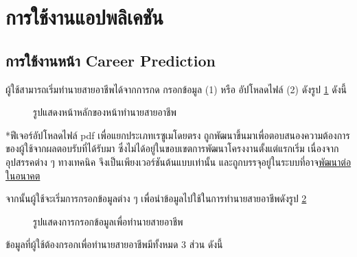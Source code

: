 \section{การใช้งานแอปพลิเคชัน}
\subsection{การใช้งานหน้า Career Prediction}
ผู้ใช้สามารถเริ่มทำนายสายอาชีพได้จากการกด กรอกข้อมูล (1) หรือ อัปโหลดไฟล์ (2) ดังรูป \ref{fig:start-CP} ดังนี้
\begin{figure}[H]\centering
    \caption{รูปแสดงหน้าหลักของหน้าทำนายสายอาชีพ}\label{fig:start-CP}
\end{figure}
*ฟีเจอร์อัปโหลดไฟล์ pdf เพื่อแยกประเภทเรซูเมโดยตรง ถูกพัฒนาขึ้นมาเพื่อตอบสนองความต้องการของผู้ใช้จากผลตอบรับที่ได้รับมา 
ซึ่งไม่ได้อยู่ในขอบเขตการพัฒนาโครงงานตั้งแต่แรกเริ่ม เนื่องจากอุปสรรคต่าง ๆ ทางเทคนิค จึงเป็นเพียงเวอร์ชันต้นแบบเท่านั้น และถูกบรรจุอยู่ในระบบที่อาจ\hyperref[subsec:Future Plan OCR]{พัฒนาต่อในอนาคต}

จากนั้นผู้ใช้จะเริ่มการกรอกข้อมูลต่าง ๆ เพื่อนำข้อมูลไปใช้ในการทำนายสายอาชีพดังรูป \ref{fig:input-CP} 
\begin{figure}[H]\centering
    \caption{รูปแสดงการกรอกข้อมูลเพื่อทำนายสายอาชีพ}\label{fig:input-CP}
\end{figure}
ข้อมูลที่ผู้ใช้ต้องกรอกเพื่อทำนายสายอาชีพมีทั้งหมด 3 ส่วน ดังนี้

